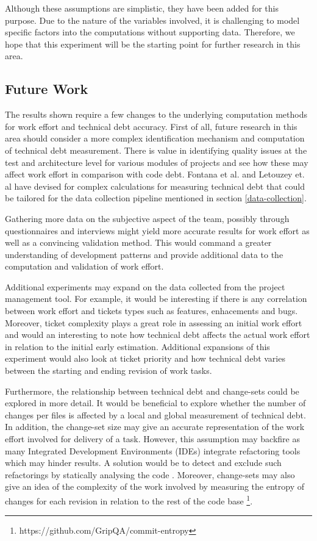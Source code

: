 \documentclass{mpaper}
\begin{document}
Although these assumptions are simplistic, they have been added for this
purpose. Due to the nature of the variables involved, it is challenging to model
specific factors into the computations without supporting data. Therefore, we
hope that this experiment will be the starting point for further research in
this area. 

\subsection{Future Work}
\label{future-work}

The results shown require a few changes to the underlying computation methods
for work effort and technical debt accuracy. First of all, future research in
this area should consider a more complex identification mechanism and
computation of technical debt measurement. There is value in identifying quality
issues at the test and architecture level for various modules of projects and
see how these may affect work effort in comparison with code debt. Fontana et
al. \cite{Fontana2016} and Letouzey et. al \cite{Letouzey2012} have devised for
complex calculations for measuring technical debt that could be tailored for the
data collection pipeline mentioned in section \ref{data-collection}.

Gathering more data on the subjective aspect of the team, possibly through
questionnaires and interviews might yield more accurate results for work effort
as well as a convincing validation method. This would command a greater
understanding of development patterns and provide additional data to the
computation and validation of work effort.

Additional experiments may expand on the data collected from the project
management tool. For example, it would be interesting if there is any
correlation between work effort and tickets types such as features, enhacements
and bugs. Moreover, ticket complexity plays a great role in assessing an initial
work effort and would an interesting to note how technical debt affects the
actual work effort in relation to the initial early estimation. Additional
expansions of this experiment would also look at ticket priority and how
technical debt varies between the starting and ending revision of work tasks. 

Furthermore, the relationship between technical debt and change-sets could be
explored in more detail. It would be beneficial to explore whether the number of
changes per files is affected by a local and global measurement of technical
debt. In addition, the change-set size may give an accurate representation of
the work effort involved for delivery of a task. However, this assumption may
backfire as many Integrated Development Environments (IDEs) integrate
refactoring tools which may hinder results. A solution would be to detect and
exclude such refactorings by statically analysing the code \cite{Silva2017}.
Moreover, change-sets may also give an idea of the complexity of the work
involved by measuring the entropy of changes for each revision in relation to
the rest of the code base \footnote{https://github.com/GripQA/commit-entropy}. 
\end{document}
